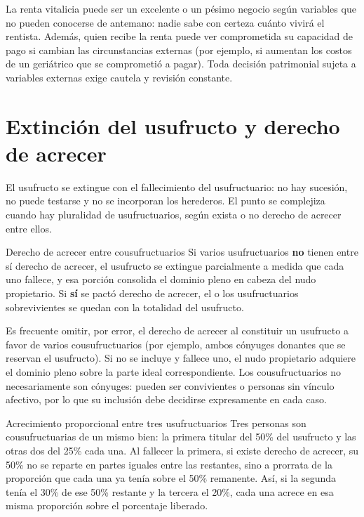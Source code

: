 \documentclass[12pt,oneside]{book}
\begin{document}
\begin{important}
La renta vitalicia puede ser un excelente o un pésimo negocio según variables que no pueden conocerse de antemano: nadie sabe con certeza cuánto vivirá el rentista. Además, quien recibe la renta puede ver comprometida su capacidad de pago si cambian las circunstancias externas (por ejemplo, si aumentan los costos de un geriátrico que se comprometió a pagar). Toda decisión patrimonial sujeta a variables externas exige cautela y revisión constante.
\end{important}

\section{Extinción del usufructo y derecho de acrecer}
\label{sec:acrecer}

El usufructo se extingue con el fallecimiento del usufructuario: no hay sucesión, no puede testarse y no se incorporan los herederos. El punto se complejiza cuando hay pluralidad de usufructuarios, según exista o no derecho de acrecer entre ellos.

\begin{definition}{Derecho de acrecer entre cousufructuarios}
Si varios usufructuarios \textbf{no} tienen entre sí derecho de acrecer, el usufructo se extingue parcialmente a medida que cada uno fallece, y esa porción consolida el dominio pleno en cabeza del nudo propietario. Si \textbf{sí} se pactó derecho de acrecer, el o los usufructuarios sobrevivientes se quedan con la totalidad del usufructo.
\end{definition}

\begin{warning}
Es frecuente omitir, por error, el derecho de acrecer al constituir un usufructo a favor de varios cousufructuarios (por ejemplo, ambos cónyuges donantes que se reservan el usufructo). Si no se incluye y fallece uno, el nudo propietario adquiere el dominio pleno sobre la parte ideal correspondiente. Los cousufructuarios no necesariamente son cónyuges: pueden ser convivientes o personas sin vínculo afectivo, por lo que su inclusión debe decidirse expresamente en cada caso.
\end{warning}

\begin{example}{Acrecimiento proporcional entre tres usufructuarios}
Tres personas son cousufructuarias de un mismo bien: la primera titular del 50\% del usufructo y las otras dos del 25\% cada una. Al fallecer la primera, si existe derecho de acrecer, su 50\% no se reparte en partes iguales entre las restantes, sino a prorrata de la proporción que cada una ya tenía sobre el 50\% remanente. Así, si la segunda tenía el 30\% de ese 50\% restante y la tercera el 20\%, cada una acrece en esa misma proporción sobre el porcentaje liberado.
\end{example}
\end{document}
